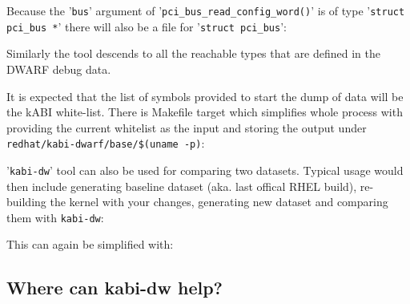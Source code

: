 \documentclass[10pt,oneside,english]{book}
\begin{document}
Because the '\texttt{bus}' argument of '\texttt{pci\_bus\_read\_config\_word()}'
is of type '\texttt{struct pci\_bus {*}}' there will also be a file
for '\texttt{struct pci\_bus}':


Similarly the tool descends to all the reachable types that are defined
in the DWARF debug data.

It is expected that the list of symbols provided to start the dump
of data will be the kABI white-list. There is Makefile target which
simplifies whole process with providing the current whitelist as the
input and storing the output under \texttt{redhat/kabi-dwarf/base/\$(uname
-p)}:


'\texttt{kabi-dw}' tool can also be used for comparing two datasets.
Typical usage would then include generating baseline dataset (aka.
last offical RHEL build), re-building the kernel with your changes,
generating new dataset and comparing them with \texttt{kabi-dw}:


This can again be simplified with:


\subsection{Where can kabi-dw help?}
\end{document}
